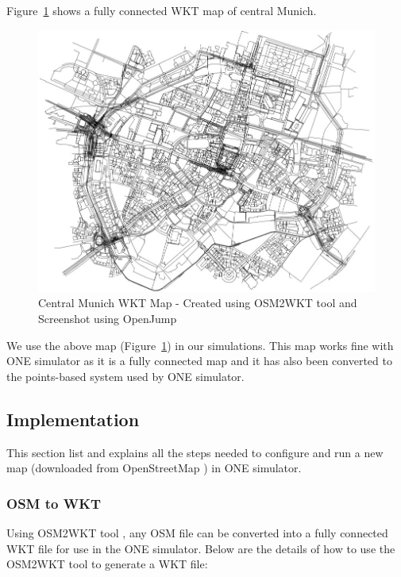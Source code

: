 	\newpage
	Figure~\ref{fig:central-munich-wkt} shows a fully connected WKT map of central Munich.
	\vspace{6mm}
	\begin{figure}[H]
		\centering
		\includegraphics[scale=0.5]{./figures/central-munich-wkt}
		\caption{Central Munich WKT Map - Created using OSM2WKT tool \cite{mayer2010osm} and Screenshot using OpenJump \cite{openjump}}
		\label{fig:central-munich-wkt}
	\end{figure}
	\vspace{3mm}
We use the above map (Figure~\ref{fig:central-munich-wkt}) in our simulations. This map works fine with ONE simulator as it is a fully connected map and it has also been converted to the points-based system used by ONE simulator.
\newpage
\subsection{Implementation}
This section list and explains all the steps needed to configure and run a new map (downloaded from OpenStreetMap \cite{openstreetmap}) in ONE simulator.
\subsubsection{OSM to WKT}
Using OSM2WKT tool \cite{mayer2010osm}, any OSM file can be converted into a fully connected WKT file for use in the ONE simulator. Below are the details of how to use the OSM2WKT tool \cite{mayer2010osm} to generate a WKT file:\newline

